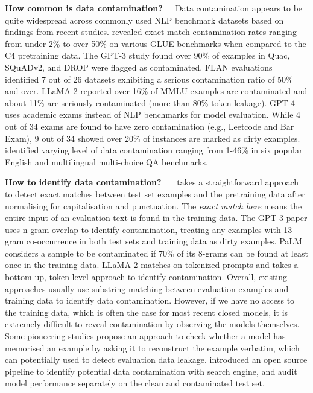 \documentclass[letterpaper]{article} %
\begin{document}
\noindent\textbf{How common is data contamination?}~~~Data contamination appears to be quite widespread across commonly used NLP benchmark datasets based on findings from recent studies. \citet{dodge2021documenting} revealed exact match contamination rates ranging from under 2\% to over 50\% on various GLUE benchmarks when compared to the C4 pretraining data. The GPT-3 study \cite{brown2020language} found over 90\% of examples in Quac, SQuADv2, and DROP were flagged as contaminated. FLAN \cite{wei2021finetuned} evaluations identified 7 out of 26 datasets exhibiting a serious contamination ratio of 50\% and over. LLaMA 2 \cite{touvron2023llama} reported over 16\% of MMLU examples are contaminated and about 11\% are seriously contaminated (more than 80\% token leakage). GPT-4 \cite{openai2023gpt4} uses academic exams instead of NLP benchmarks for model evaluation. While 4 out of 34 exams are found to have zero contamination (e.g., Leetcode and Bar Exam), 9 out of 34 showed over 20\% of instances are marked as dirty examples. \citet{li2023open} identified varying level of data contamination ranging from 1-46\% in six popular English and multilingual multi-choice QA benchmarks.

\noindent\textbf{How to identify data contamination?}~~~\citet{dodge2021documenting} takes a straightforward approach to detect exact matches between test set examples and the pretraining data after normalising for capitalisation and punctuation. The \textit{exact match here} means the entire input of an evaluation text is found in the training data. The GPT-3 paper \cite{brown2020language} uses n-gram overlap to identify contamination, treating any examples with 13-gram co-occurrence in both test sets and training data as dirty examples. PaLM \cite{chowdhery2022palm} considers a sample to be contaminated if 70\% of its 8-grams can be found at least once in the training data. LLaMA-2 matches on tokenized prompts and takes a bottom-up, token-level approach to identify contamination. Overall, existing approaches usually use substring matching between evaluation examples and training data to identify data contamination. However, if we have no access to the training data, which is often the case for most recent closed models, it is extremely difficult to reveal contamination by observing the models themselves. Some pioneering studies \cite{carlini2021extracting,carlini2022quantifying,li2023estimating} propose an approach to check whether a model has memorised an example by asking it to reconstruct the example verbatim, which can potentially used to detect evaluation data leakage. \citet{li2023open} introduced an open source pipeline to identify potential data contamination with search engine, and audit model performance separately on the clean and contaminated test set.
\end{document}

